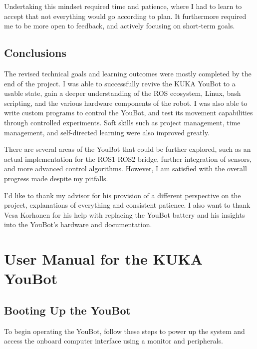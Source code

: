 \documentclass[a4paper, 12pt]{article}
\begin{document}
    Undertaking this mindset required time and patience, where I had to learn to accept that not everything would go according to plan. It furthermore required me to be more open to feedback, and actively focusing on short-term goals. 

    \subsection{Conclusions}

    The revised technical goals and learning outcomes were mostly completed by the end of the project. I was able to successfully revive the KUKA YouBot to a usable state, gain a deeper understanding of the ROS ecosystem, Linux, bash scripting, and the various hardware components of the robot. I was also able to write custom programs to control the YouBot, and test its movement capabilities through controlled experiments. Soft skills such as project management, time management, and self-directed learning were also improved greatly. 
    
    There are several areas of the YouBot that could be further explored, such as an actual implementation for the ROS1-ROS2 bridge, further integration of sensors, and more advanced control algorithms. However, I am satisfied with the overall progress made despite my pitfalls. 

    I'd like to thank my advisor for his provision of a different perspective on the project, explanations of everything and consistent patience. I also want to thank Vesa Korhonen for his help with replacing the YouBot battery and his insights into the YouBot's hardware and documentation.



    \newpage

    \printbibliography

    \newpage

    \appendix


    \section{User Manual for the KUKA YouBot}

    \subsection{Booting Up the YouBot}
    To begin operating the YouBot, follow these steps to power up the system and access the onboard computer interface using a monitor and peripherals. 
\end{document}
